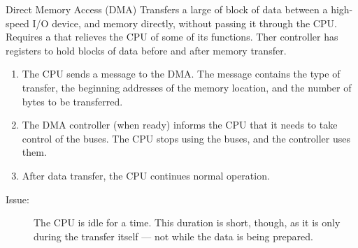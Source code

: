 \documentclass[\main/notes.tex]{subfiles}
\begin{document}
					\begin{definition}{Direct Memory Access (DMA)}
						Transfers a large of block of data between a high-speed I/O device, and memory directly, without passing it through the CPU. Requires a  that relieves the CPU of some of its functions. Ther controller has registers to hold blocks of data before and after memory transfer.
						\begin{enumerate}
							\item The CPU sends a message to the DMA. The message contains the type of transfer, the beginning addresses of the memory location, and the number of bytes to be transferred.
							\item The DMA controller (when ready) informs the CPU that it needs to take control of the buses. The CPU stops using the buses, and the controller uses them.
							\item After data transfer, the CPU continues normal operation.
						\end{enumerate}
						\begin{description}
							\item[Issue:] The CPU is idle for a time. This duration is short, though, as it is only during the transfer itself --- not while the data is being prepared.
						\end{description}
					\end{definition}
				\pagebreak
\end{document}
